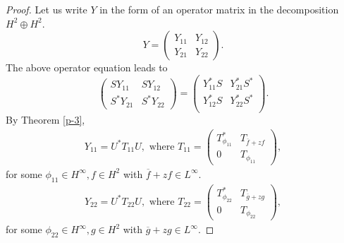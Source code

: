 \documentclass[12pt, reqno]{amsart}
\theoremstyle{definition}
\theoremstyle{remark}
\numberwithin{equation}{section}
\begin{document}
        \begin{proof}
           Let us write $Y$ in the form of an operator matrix in the decomposition $H^2\oplus H^2$.
           \begin{equation*}
            Y=
               \begin{pmatrix}
                   Y_{11}&Y_{12}\\
                   Y_{21}&Y_{22}
               \end{pmatrix}.
           \end{equation*}
           The above operator equation leads to
           \begin{equation*}
                \begin{pmatrix}
                   SY_{11}&SY_{12}\\
                   S^*Y_{21}&S^*Y_{22}
               \end{pmatrix}
               =
               \begin{pmatrix}
                   Y^*_{11}S&Y^*_{21}S^*\\
                   Y^*_{12}S&Y^*_{22}S^*\\
               \end{pmatrix}.
           \end{equation*}
             By Theorem \ref{p-3}, 
             \begin{align*}
                 Y_{11}=U^*T_{11}U, \text{ where } T_{11}=
             \begin{pmatrix}
                 T^*_{\phi_{11}}&T_{\overline{f}+zf}\\
                 0&T_{\phi_{11}}
             \end{pmatrix},
             \end{align*}
             for some $\phi_{11} \in H^\infty, f \in H^2$ with $\overline{f}+zf \in L^\infty.$
             \begin{align*}
                 Y_{22}=U^*T_{22}U, \text{ where } T_{22}=
             \begin{pmatrix}
                 T^*_{\phi_{22}}&T_{\overline{g}+zg}\\
                 0&T_{\phi_{22}}
             \end{pmatrix},
             \end{align*}
             for some $\phi_{22} \in H^\infty, g \in H^2$ with $\overline{g}+zg\in L^\infty.$
             

\end{proof}
\end{document}
